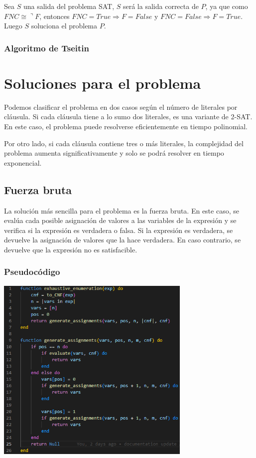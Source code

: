 \documentclass{article}
\begin{document}
            Sea $S$ una salida del problema SAT, $S$ será la salida correcta de $P$, ya que como $FNC \cong \urcorner F$, entonces 
            $FNC = True \Rightarrow  F = False$ y $FNC = False \Rightarrow F = True$. Luego $S$ soluciona el problema $P$.

        \subsubsection*{Algoritmo de Tseitin}
    
\section*{Soluciones para el problema}

    Podemos clasificar el problema en dos casos según el número 
    de literales por cláusula. Si cada cláusula tiene a lo sumo dos literales, es una variante de 2-SAT. 
    En este caso, el problema puede resolverse eficientemente en tiempo polinomial.

    Por otro lado, si cada cláusula contiene tres o más literales, la complejidad del problema 
    aumenta significativamente y solo se podrá resolver en tiempo exponencial.

    \subsection*{Fuerza bruta}

        La solución más sencilla para el problema es la fuerza bruta. En este caso, se evalúa 
        cada posible asignación de valores a las variables de la expresión y se verifica si la 
        expresión es verdadera o falsa. Si la expresión es verdadera, se devuelve la asignación 
        de valores que la hace verdadera. En caso contrario, se devuelve que la expresión no es 
        satisfacible.

        \subsubsection*{Pseudocódigo}

            \includegraphics[width = 0.7\textwidth]{resources/code1.png}
\end{document}
